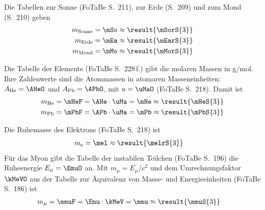 \begin{abcliste}
\abc Die Tabellen zur Sonne (FoTaBe S.~211), zur Erde (S.~209) und zum Mond (S.~210) geben
\begin{align}
 m_\text{Sonne} &= \mSo \approx \result{\mSorS{3}} \\
 m_\text{Erde} &= \mEa \approx \result{\mEarS{3}} \\
 m_\text{Mond} &= \mMo \approx \result{\mMorS{3}}
\end{align}

\abc Die Tabelle der Elemente (FoTaBe S.~228\,f.) gibt die molaren Massen in g/mol. Ihre Zahlenwerte sind die Atommassen in atomaren Masseneinheiten: $A_\text{He} = \AHeO$ und $A_\text{Pb} = \APbO$, mit $u = \uMaO$ (FoTaBe S.~218). Damit ist
\begin{align}
 m_\text{He} &= \mHeF = \AHe\cdot\uMa = \mHe \approx \result{\mHeS{3}} \\
 m_\text{Pb} &= \mPbF = \APb\cdot\uMa = \mPb \approx \result{\mPbS{3}}
\end{align}

\abc Die Ruhemasse des Elektrons (FoTaBe S.~218) ist
\begin{align}
 m_\text{e} &= \mel \approx \result{\melrS{3}}
\end{align}
Für das Myon gibt die Tabelle der instabilen Teilchen (FoTaBe S.~196) die Ruheenergie $E_\mu = \EmuO$ an. Mit $m_\mu = E_\mu/c^2$ und dem Umrechnungsfaktor $\kMeVO$ aus der Tabelle zur Äquivalenz von Masse- und Energieeinheiten (FoTaBe S.~186) ist
\begin{align}
 m_\mu &= \mmuF = \Emu\cdot\kMeV = \mmu \approx \result{\mmuS{3}}
\end{align}
\end{abcliste}
